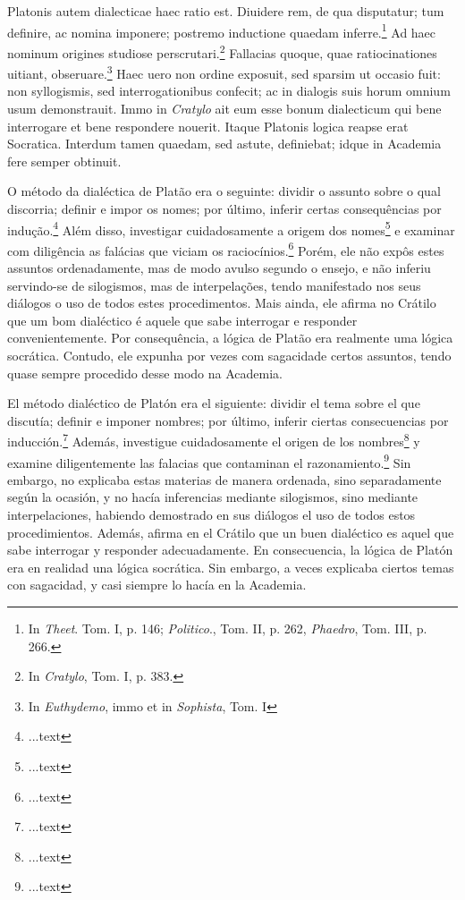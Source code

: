 \documentclass{article}
\begin{document}
\begin{paracol}{3}
\begin{nthcolumn}{2}
  \end{nthcolumn}
  \vspace{0.5cm}
  \begin{nthcolumn*}{0} %
    Platonis autem dialecticae haec ratio est. Diuidere rem, de qua disputatur; tum definire, ac nomina imponere; postremo inductione quaedam inferre.\footnote[21]{In \emph{Theet}. Tom. I, p. 146; \emph{Politico}., Tom. II, p. 262, \emph{Phaedro}, Tom. III, p. 266.} Ad haec nominum origines studiose perscrutari.\footnote[22]{In \emph{Cratylo}, Tom. I, p. 383.} Fallacias quoque, quae ratiocinationes uitiant, obseruare.\footnote[23]{In \emph{Euthydemo}, immo et in \emph{Sophista}, Tom. I} Haec uero non ordine exposuit, sed sparsim ut occasio fuit: non syllogismis, sed interrogationibus confecit; ac in dialogis suis horum omnium usum
    demonstrauit. Immo in \emph{Cratylo} ait eum esse bonum dialecticum qui bene interrogare et bene respondere nouerit. Itaque Platonis logica reapse erat Socratica. Interdum tamen quaedam, sed astute, definiebat; idque in Academia fere semper obtinuit.
  \end{nthcolumn*}
  \vspace{0.5cm}
  \begin{nthcolumn}{1} %
    O método da dialéctica de Platão era o seguinte: dividir o assunto sobre o qual discorria; definir e impor os nomes; por último, inferir certas consequências por indução.\footnote[21]{...text} Além disso, investigar cuidadosamente a origem dos nomes\footnote[22]{...text} e examinar com diligência as falácias que viciam os raciocínios.\footnote[23]{...text} Porém, ele não expôs estes assuntos ordenadamente, mas de modo avulso segundo o ensejo, e não inferiu servindo-se de silogismos, mas de interpelações, tendo manifestado nos seus diálogos o uso de todos estes procedimentos. Mais ainda, ele afirma no Crátilo que um bom dialéctico é aquele que sabe interrogar e responder convenientemente. Por consequência, a lógica de Platão era realmente uma lógica socrática. Contudo, ele expunha por vezes com sagacidade certos assuntos, tendo quase sempre procedido desse modo na Academia.
  \end{nthcolumn}
  \vspace{0.5cm}
  \begin{nthcolumn}{2} %
    El método dialéctico de Platón era el siguiente: dividir el tema sobre el que discutía; definir e imponer nombres; por último, inferir ciertas consecuencias por inducción.\footnote[21]{...text} Además, investigue cuidadosamente el origen de los nombres\footnote[22]{...text} y examine diligentemente las falacias que contaminan el razonamiento.\footnote[23]{...text} Sin embargo, no explicaba estas materias de manera ordenada, sino separadamente según la ocasión, y no hacía inferencias mediante silogismos, sino mediante interpelaciones, habiendo demostrado en sus diálogos el uso de todos estos procedimientos. Además, afirma en el Crátilo que un buen dialéctico es aquel que sabe interrogar y responder adecuadamente. En consecuencia, la lógica de Platón era en realidad una lógica socrática. Sin embargo, a veces explicaba ciertos temas con sagacidad, y casi siempre lo hacía en la Academia.

\end{nthcolumn}
\end{paracol}
\end{document}
